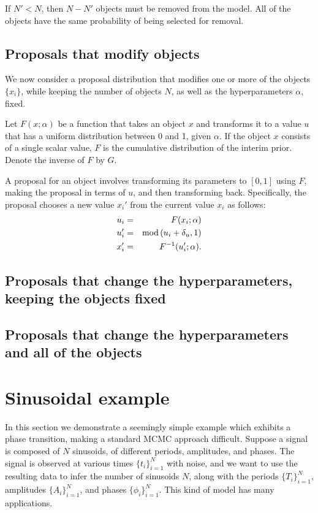 \documentclass[letterpaper, 11pt]{article}
\begin{document}
If $N' < N$, then $N - N'$ objects must be removed from the model. All
of the objects have the same probability of being selected for removal.

\subsection{Proposals that modify objects}
We now consider a proposal distribution that modifies one or more of the
objects $\{x_i\}$, while keeping the number of objects $N$, as well as the
hyperparameters $\alpha$, fixed.

Let $F(x; \alpha)$ be a function that takes an object $x$ and transforms it
to a value $u$ that has a uniform distribution between 0 and 1, given $\alpha$.
If the object $x$ consists of a single scalar value, $F$ is the cumulative
distribution of the interim prior. Denote the inverse of $F$ by $G$.

A proposal
for an object involves transforming its parameters to $[0, 1]$ using $F$,
making the proposal in terms of $u$, and then transforming back.
Specifically, the proposal chooses
a new value $x_i'$ from the current value $x_i$ as follows:
\begin{eqnarray}
u_i &=& F(x_i; \alpha)\\
u_i' &=& \textnormal{mod}\left(u_i + \delta_u, 1\right)\\
x_i' &=& F^{-1}(u_i'; \alpha).
\end{eqnarray}

\subsection{Proposals that change the hyperparameters, keeping the objects fixed}

\subsection{Proposals that change the hyperparameters and all of the objects}

\section{Sinusoidal example}
In this section we demonstrate a seemingly simple example which exhibits
a phase transition, making a standard MCMC approach difficult. Suppose
a signal is composed of $N$ sinusoids, of different periods, amplitudes,
and phases. The signal is observed at various times $\{t_i\}_{i=1}^N$ with
noise, and we want to use the resulting data to infer the number of sinusoids
$N$, along with the periods $\{T_i\}_{i=1}^N$, amplitudes $\{A_i\}_{i=1}^N$,
and phases $\{\phi_i\}_{i=1}^N$.
This kind of model has many applications\citep[see e.g.][]{bretthorst}.
\end{document}
